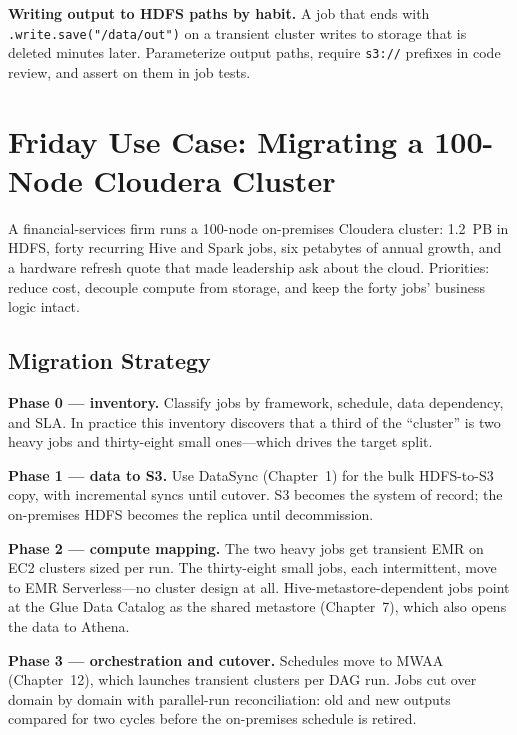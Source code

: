 \begin{pitfall}
\textbf{Writing output to HDFS paths by habit.} A job that ends with \texttt{.write.save("/data/out")} on a transient cluster writes to storage that is deleted minutes later. Parameterize output paths, require \texttt{s3://} prefixes in code review, and assert on them in job tests.
\end{pitfall}

\section{Friday Use Case: Migrating a 100-Node Cloudera Cluster}
A financial-services firm runs a 100-node on-premises Cloudera cluster: 1.2~PB in HDFS, forty recurring Hive and Spark jobs, six petabytes of annual growth, and a hardware refresh quote that made leadership ask about the cloud. Priorities: reduce cost, decouple compute from storage, and keep the forty jobs' business logic intact.

\subsection{Migration Strategy}
\textbf{Phase 0 --- inventory.} Classify jobs by framework, schedule, data dependency, and SLA. In practice this inventory discovers that a third of the ``cluster'' is two heavy jobs and thirty-eight small ones---which drives the target split.

\textbf{Phase 1 --- data to S3.} Use DataSync (Chapter~1) for the bulk HDFS-to-S3 copy, with incremental syncs until cutover. S3 becomes the system of record; the on-premises HDFS becomes the replica until decommission.

\textbf{Phase 2 --- compute mapping.} The two heavy jobs get transient EMR on EC2 clusters sized per run. The thirty-eight small jobs, each intermittent, move to EMR Serverless---no cluster design at all. Hive-metastore-dependent jobs point at the Glue Data Catalog as the shared metastore (Chapter~7), which also opens the data to Athena.

\textbf{Phase 3 --- orchestration and cutover.} Schedules move to MWAA (Chapter~12), which launches transient clusters per DAG run. Jobs cut over domain by domain with parallel-run reconciliation: old and new outputs compared for two cycles before the on-premises schedule is retired.

